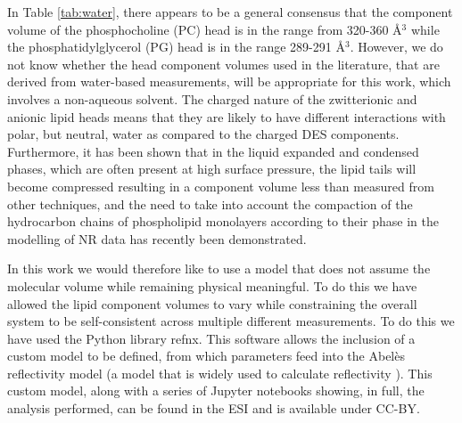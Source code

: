 \documentclass[twoside,twocolumn,9pt]{article}
\begin{document}
In Table \ref{tab:water}, there appears to be a general consensus that the component volume of the phosphocholine (PC) head is in the range from 320-360 \AA$^3$ while the phosphatidylglycerol (PG) head is in the range 289-291 \AA$^3$. However, we do not know whether the head component volumes used in the literature, that are derived from water-based measurements, will be appropriate for this work, which involves a non-aqueous solvent. The charged nature of the zwitterionic and anionic lipid heads means that they are likely to have different interactions with polar, but neutral, water as compared to the charged DES components.\cite{Sanchez-Fernandez2018} Furthermore, it has been shown that in the liquid expanded and condensed phases, which are often present at high surface pressure, the lipid tails will become compressed resulting in a component volume less than measured from other techniques,\cite{Marsh2010,Small1984} and the need to take into account the compaction of the hydrocarbon chains of phospholipid monolayers according to their phase in the modelling of NR data has recently been demonstrated.\cite{Campbell2018}

In this work we would therefore like to use a model that does not assume the molecular volume while remaining physical meaningful. To do this we have allowed the lipid component volumes to vary while constraining the overall system to be self-consistent across multiple different measurements. To do this we have used the Python library refnx\cite{Nelson2018}. This software allows the inclusion of a custom model to be defined, from which parameters feed into the Abel\`{e}s reflectivity model (a model that is widely used to calculate reflectivity \cite{Abeles1950,Parratt1954}). This custom model, along with a series of Jupyter notebooks showing, in full, the analysis performed, can be found in the ESI and is available under CC-BY.\cite{mccluskey_2018}
\end{document}
